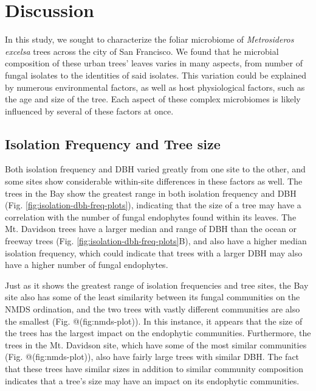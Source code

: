 \documentclass[fleqn,10pt,lineno]{wlpeerj} %
\begin{document}
\hypertarget{discussion}{%
\section*{Discussion}\label{discussion}}

In this study, we sought to characterize the foliar microbiome of \emph{Metrosideros excelsa} trees across the city of San Francisco. We found that he microbial composition of these urban trees' leaves varies in many aspects, from number of fungal isolates to the identities of said isolates. This variation could be explained by numerous environmental factors, as well as host physiological factors, such as the age and size of the tree. Each aspect of these complex microbiomes is likely influenced by several of these factors at once.

\hypertarget{isolation-frequency-and-tree-size}{%
\subsection*{Isolation Frequency and Tree size}\label{isolation-frequency-and-tree-size}}

Both isolation frequency and DBH varied greatly from one site to the other, and some sites show considerable within-site differences in these factors as well. The trees in the Bay show the greatest range in both isolation frequency and DBH (Fig. \ref{fig:isolation-dbh-freq-plots}), indicating that the size of a tree may have a correlation with the number of fungal endophytes found within its leaves. The Mt. Davidson trees have a larger median and range of DBH than the ocean or freeway trees (Fig. \ref{fig:isolation-dbh-freq-plots}B), and also have a higher median isolation frequency, which could indicate that trees with a larger DBH may also have a higher number of fungal endophytes.

Just as it shows the greatest range of isolation frequencies and tree sites, the Bay site also has some of the least similarity between its fungal communities on the NMDS ordination, and the two trees with vastly different communities are also the smallest (Fig. @(fig:nmds-plot)). In this instance, it appears that the size of the trees has the largest impact on the endophytic communities. Furthermore, the trees in the Mt. Davidson site, which have some of the most similar communities (Fig. @(fig:nmds-plot)), also have fairly large trees with similar DBH. The fact that these trees have similar sizes in addition to similar community composition indicates that a tree's size may have an impact on its endophytic communities.
\end{document}
